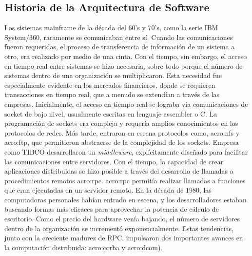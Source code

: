 \subsection{Historia de la Arquitectura de Software}
\label{historia}

Los sistemas mainframe de la década del 60’s y 70’s, como la serie IBM System/360, raramente se comunicaban entre sí.  Cuando las comunicaciones fueron requeridas, el proceso de transferencia de información de un sistema a otro, era realizado por medio de una cinta.  Con el tiempo, sin embargo, el acceso en tiempo real entre sistemas se hizo necesaria, sobre todo porque el número de sistemas dentro de una organización se multiplicaron. Esta necesidad fue especialmente evidente en los mercados financieros, donde se requieren transacciones en tiempo real, que a menudo se extendían a través de las empresas.
Inicialmente, el acceso en tiempo real se lograba vía comunicaciones de socket de bajo nivel, usualmente escritas en lenguaje assembler o C.  La programación de sockets era compleja y requería amplios conocimientos en los protocolos de redes.  Más tarde, entraron en escena protocolos como, \gls{acro:nfs} y \gls{acro:ftp}, que permitieron abstraerse de la complejidad de los sockets.
Empresa como TIBCO desarrollaron un \textit{middleware}, explícitamente diseñado para facilitar las comunicaciones entre servidores.  Con el tiempo, la capacidad de crear aplicaciones distribuidas se hizo posible a través del desarrollo de llamadas a procedimientos remotos \gls{acro:rpc}. \gls{acro:rpc} permitía realizar llamadas a funciones que eran ejecutadas en un servidor remoto.
En la década de 1980, las computadoras personales habían entrado en escena, y los desarrolladores estaban buscando formas más eficaces para aprovechar la potencia de cálculo de escritorio. Como el precio del hardware venía bajando, el número de servidores dentro de la organización se incrementó exponencialmente. Estas tendencias, junto con la creciente madurez de RPC, impulsaron dos importantes avances en la computación distribuida: \gls{acro:corba} y \gls{acro:dcom}).

